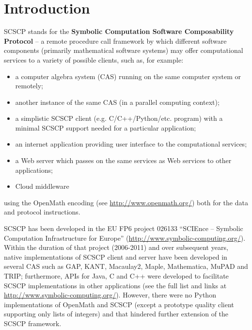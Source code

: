 \documentclass{deliverablereport}
\author{ }
\begin{document}
\maketitle
%
\strut\githubissuedescription
\newpage\tableofcontents\newpage

\section{Introduction}\label{intro}

{\sf SCSCP} stands for the 
{\bf Symbolic Computation Software Composability Protocol}
-- a remote procedure call framework by which different
software components (primarily mathematical software systems) 
may offer computational services to a variety of possible
clients, such as, for example:
\begin{itemize}
\item a computer algebra system (CAS) running on the same computer system or remotely;
\item another instance of the same CAS (in a parallel computing context);
\item a simplistic SCSCP client (e.g. C/C++/Python/etc. program) with a minimal 
SCSCP support needed for a particular application;
\item an internet application providing user interface to the computational services;
\item a Web server which passes on the same services as Web services to other applications;
\item Cloud middleware
\end{itemize}
using the OpenMath encoding (see \url{http://www.openmath.org/})
both for the data and protocol instructions. 

SCSCP has been developed in the EU FP6 project 026133 
``SCIEnce -- Symbolic Computation Infrastructure for Europe''
(\url{http://www.symbolic-computing.org/}).
Within the duration of that project (2006-2011) and over subsequent
years, native implementations of SCSCP client and server have been developed in
several CAS such as GAP, KANT, Macaulay2, Maple, Mathematica, MuPAD
and TRIP; furthermore, APIs for Java, C and C++ were developed
to facilitate SCSCP implementations in other applications
(see the full list and links at \url{http://www.symbolic-computing.org/}).
However, there were no Python implementations of OpenMath and SCSCP 
(except a prototype quality client supporting only lists of integers)
and that hindered further extension of the SCSCP framework.
\end{document}
